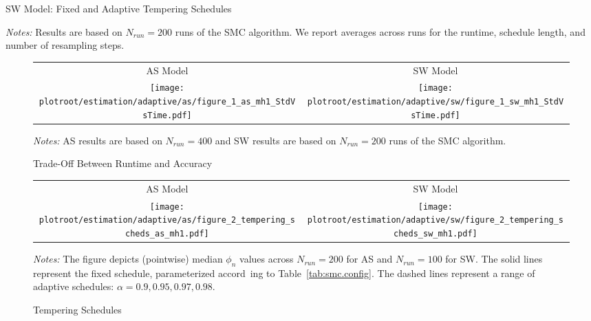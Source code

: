 \documentclass[12pt]{article}
\theoremstyle{definition}
\newcommand\plotroot{../figures_for_paper}
\begin{document}
\begin{table}[H]
    \caption{SW Model: Fixed and Adaptive Tempering Schedules}
    \label{tab:sw.smcsummary}
    \begin{center}
        
    \end{center}
    {\footnotesize {\em Notes:} Results are based on $N_{run} = 200$ runs of the SMC algorithm. We report averages across runs for the runtime, schedule length, and number of resampling steps.}\setlength{\baselineskip}{4mm}
\end{table}

\begin{figure}[H]
    \caption{Trade-Off Between Runtime and Accuracy}
    \label{fig:smc_time_v_accuracy}
    \begin{center}
        \begin{tabular}{cc}
            AS Model & SW Model \\
            \texttt{[image: \\plotroot/estimation/adaptive/as/figure\_1\_as\_mh1\_StdVsTime.pdf]} &
            \texttt{[image: \\plotroot/estimation/adaptive/sw/figure\_1\_sw\_mh1\_StdVsTime.pdf]}
        \end{tabular}
    \end{center}
    {\footnotesize {\em Notes:} AS results are based on $N_{run} = 400$ and SW results are based on $N_{run} = 200$ runs of the SMC algorithm.}\setlength{\baselineskip}{4mm}
\end{figure}

\begin{figure}[H]
    \caption{Tempering Schedules}
    \label{fig:smc_tempering}
    \begin{center}
        \begin{tabular}{cc}
        AS Model & SW Model \\
        \texttt{[image: \\plotroot/estimation/adaptive/as/figure\_2\_tempering\_scheds\_as\_mh1.pdf]} &
        \texttt{[image: \\plotroot/estimation/adaptive/sw/figure\_2\_tempering\_scheds\_sw\_mh1.pdf]}
        \end{tabular}
    \end{center}
    {\footnotesize {\em Notes:} The figure depicts (pointwise) median $\phi_n$ values across $N_{run} = 200$ for AS and $N_{run} = 100$ for SW. The solid lines represent the fixed schedule, parameterized accord\
ing to Table~\ref{tab:smc.config}. The dashed lines represent a range of adaptive schedules: $\alpha = 0.9, 0.95, 0.97, 0.98$.
}\setlength{\baselineskip}{4mm}
\end{figure}
\end{document}
